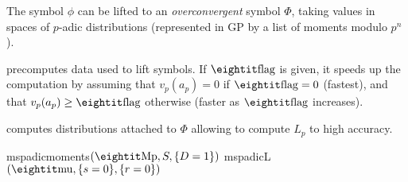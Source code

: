 The symbol $\phi$ can be lifted to an \emph{overconvergent} symbol $\Phi$,
taking values in spaces of $p$-adic distributions (represented in GP by a
list of moments modulo $p^n$).

 precomputes data used to lift symbols. If $\fl$ is given,
it speeds up the computation by assuming that $v_p(a_p) = 0$ if $\fl = 0$
(fastest), and that $v_p(a_p) \geq \fl$ otherwise (faster as $\fl$ increases).

 computes distributions  attached to $\Phi$
allowing to compute $L_p$ to high accuracy.

   {mspadicmoments$(\var{Mp}, S, \{D=1\})$}
   {mspadicL$(\var{mu}, \{s = 0\}, \{r = 0\})$}

\copyrightnotice
\bye

